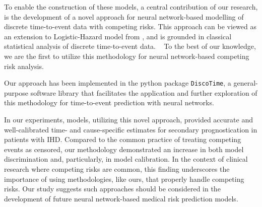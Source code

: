 To enable the construction of these models, 
a central contribution of our research, 
is the development of a novel approach for
neural network-based modelling of 
discrete time-to-event data with competing risks.
This approach can be viewed as an extension to
Logistic-Hazard model from 
\textcite{gensheimerScalable2019},
and is grounded in classical statistical analysis of 
discrete time-to-event data.
~\autocite{tutzModeling2016}
To the best of our knowledge, 
we are the first to utilize this methodology
for neural network-based competing risk analysis.

Our approach has been implemented in the python package \texttt{DiscoTime},
a general-purpose software library that facilitates the application 
and further exploration of this methodology for 
time-to-event prediction with neural networks.
~\autocite{holmDiscotime}

In our experiments,  models,
utilizing this novel approach, 
provided accurate and well-calibrated time- and cause-specific 
estimates for secondary prognostication in patients with \ac{IHD}.
Compared to the common practice of treating competing events as censored,
our methodology demonstrated an increase in both model
discrimination and, particularly, in model calibration.
In the context of clinical research where competing risks are common,
this finding underscores the importance of using methodologies, 
like ours, that properly handle competing risks. 
Our study suggests such approaches should be considered in 
the development of future neural network-based medical risk prediction models.
